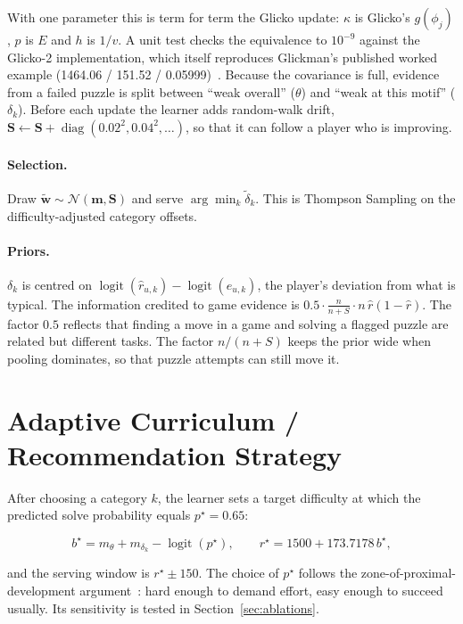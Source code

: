 \noindent With one parameter this is term for term the Glicko update: $\kappa$ is Glicko's $g(\phi_j)$,
$p$ is $E$ and $h$ is $1/v$. A unit test checks the equivalence to $10^{-9}$ against the Glicko-2
implementation, which itself reproduces Glickman's published worked example (1464.06 / 151.52 /
0.05999)~\cite{glickman2012example}. Because the covariance is full, evidence from a failed puzzle is
split between ``weak overall'' ($\theta$) and ``weak at this motif'' ($\delta_k$). Before each update
the learner adds random-walk drift, $\mathbf{S} \leftarrow \mathbf{S} + \operatorname{diag}(0.02^2,
0.04^2,\dots)$, so that it can follow a player who is improving.

\paragraph{Selection.} Draw $\tilde{\mathbf{w}} \sim \mathcal{N}(\mathbf{m},\mathbf{S})$ and serve
$\arg\min_k \tilde\delta_k$. This is Thompson Sampling on the difficulty-adjusted category offsets.

\paragraph{Priors.} $\delta_k$ is centred on $\operatorname{logit}(\hat r_{u,k}) -
\operatorname{logit}(e_{u,k})$, the player's deviation from what is typical. The information credited
to game evidence is $0.5 \cdot \tfrac{n}{n+S} \cdot n\,\hat r(1-\hat r)$. The factor $0.5$ reflects
that finding a move in a game and solving a flagged puzzle are related but different tasks. The factor
$n/(n+S)$ keeps the prior wide when pooling dominates, so that puzzle attempts can still move it.

\section{Adaptive Curriculum / Recommendation Strategy}

After choosing a category $k$, the learner sets a target difficulty at which the predicted solve
probability equals $p^\star = 0.65$:

\begin{equation}
  b^\star = m_\theta + m_{\delta_k} - \operatorname{logit}(p^\star), \qquad
  r^\star = 1500 + 173.7178\, b^\star ,
\end{equation}

\noindent and the serving window is $r^\star \pm 150$. The choice of $p^\star$ follows the
zone-of-proximal-development argument~\cite{vygotsky1978mind}: hard enough to demand effort, easy enough
to succeed usually. Its sensitivity is tested in Section~\ref{sec:ablations}.

